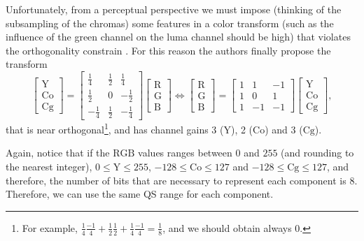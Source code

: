 Unfortunately, from a perceptual perspective we must impose (thinking
of the subsampling of the chromas) some features in a color transform
(such as the influence of the green channel on the luma channel should
be high) that violates the orthogonality constrain
\cite{malvar2008lifting}. For this reason the authors finally propose
the transform
\begin{equation}
  \begin{bmatrix}
    \text{Y} \\
    \text{Co} \\
    \text{Cg}
  \end{bmatrix}
  =
  \begin{bmatrix}
    \frac{1}{4} &  \frac{1}{2}  &  \frac{1}{4} \\ 
    \frac{1}{2} &            0  & -\frac{1}{2} \\
    -\frac{1}{4} &  \frac{1}{2}  & -\frac{1}{4}
  \end{bmatrix}
  \begin{bmatrix}
    \text{R} \\
    \text{G} \\
    \text{B}
  \end{bmatrix}
  \Leftrightarrow
  \begin{bmatrix}
    \text{R} \\
    \text{G} \\
    \text{B}
  \end{bmatrix}
  =
  \begin{bmatrix}
    1  &  1  & -1 \\ 
    1  &  0  &  1 \\ 
    1  & -1  & -1
  \end{bmatrix}
  \begin{bmatrix}
    \text{Y} \\
    \text{Co} \\
    \text{Cg}
  \end{bmatrix},
\end{equation}
that is near orthogonal\footnote{For example, $\frac{1}{4}\frac{-1}{4}
+ \frac{1}{2}\frac{1}{2} + \frac{1}{4}\frac{-1}{4} = \frac{1}{8}$, and
we should obtain always 0.}, and has channel gains 3 ($\text{Y}$), 2
($\text{Co}$) and 3 ($\text{Cg}$). %

Again, notice that if the $\text{RGB}$ values ranges between $0$
and $255$ (and rounding to the nearest integer), $0\le\text{Y}\le 255$,
$-128\le\text{Co}\le 127$ and $-128\le\text{Cg}\le 127$, and
therefore, the number of bits that are necessary to represent each
component is $8$. Therefore, we can use the same QS range for each
component.


